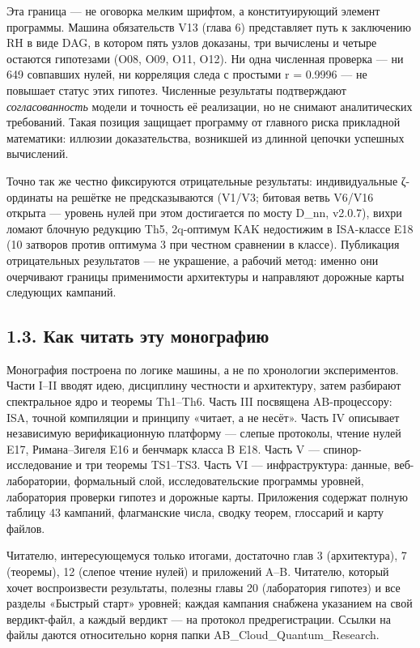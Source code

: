 \documentclass[11pt,a4paper]{article}
\begin{document}
Эта граница — не оговорка мелким шрифтом, а конституирующий элемент программы. Машина обязательств V13 (глава 6) представляет путь к заключению RH в виде DAG, в котором пять узлов доказаны, три вычислены и четыре остаются гипотезами (O08, O09, O11, O12). Ни одна численная проверка — ни 649 совпавших нулей, ни корреляция следа с простыми r = 0.9996 — не повышает статус этих гипотез. Численные результаты подтверждают \emph{согласованность} модели и точность её реализации, но не снимают аналитических требований. Такая позиция защищает программу от главного риска прикладной математики: иллюзии доказательства, возникшей из длинной цепочки успешных вычислений.

Точно так же честно фиксируются отрицательные результаты: индивидуальные ζ-ординаты на решётке не предсказываются (V1/V3; битовая ветвь V6/V16 открыта — уровень нулей при этом достигается по мосту D\_nn, v2.0.7), вихри ломают блочную редукцию Th5, 2q-оптимум KAK недостижим в ISA-классе E18 (10 затворов против оптимума 3 при честном сравнении в классе). Публикация отрицательных результатов — не украшение, а рабочий метод: именно они очерчивают границы применимости архитектуры и направляют дорожные карты следующих кампаний.

\subsection{1.3. Как читать эту монографию}

Монография построена по логике машины, а не по хронологии экспериментов. Части I–II вводят идею, дисциплину честности и архитектуру, затем разбирают спектральное ядро и теоремы Th1–Th6. Часть III посвящена AB-процессору: ISA, точной компиляции и принципу «читает, а не несёт». Часть IV описывает независимую верификационную платформу — слепые протоколы, чтение нулей E17, Римана–Зигеля E16 и бенчмарк класса B E18. Часть V — спинор-исследование и три теоремы TS1–TS3. Часть VI — инфраструктура: данные, веб-лаборатории, формальный слой, исследовательские программы уровней, лаборатория проверки гипотез и дорожные карты. Приложения содержат полную таблицу 43 кампаний, флагманские числа, сводку теорем, глоссарий и карту файлов.

Читателю, интересующемуся только итогами, достаточно глав 3 (архитектура), 7 (теоремы), 12 (слепое чтение нулей) и приложений A–B. Читателю, который хочет воспроизвести результаты, полезны главы 20 (лаборатория гипотез) и все разделы «Быстрый старт» уровней; каждая кампания снабжена указанием на свой вердикт-файл, а каждый вердикт — на протокол предрегистрации. Ссылки на файлы даются относительно корня папки AB\_Cloud\_Quantum\_Research.
\end{document}
